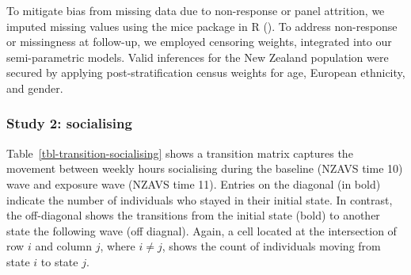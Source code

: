 \documentclass[
  singlecolumn]{article}
\begin{document}
To mitigate bias from missing data due to non-response or panel
attrition, we imputed missing values using the mice package in R
(). To address non-response
or missingness at follow-up, we employed censoring weights, integrated
into our semi-parametric models. Valid inferences for the New Zealand
population were secured by applying post-stratification census weights
for age, European ethnicity, and gender.

\subsubsection{Study 2: socialising}\label{study-2-socialising}

Table~\ref{tbl-transition-socialising} shows a transition matrix
captures the movement between weekly hours socialising during the
baseline (NZAVS time 10) wave and exposure wave (NZAVS time 11). Entries
on the diagonal (in bold) indicate the number of individuals who stayed
in their initial state. In contrast, the off-diagonal shows the
transitions from the initial state (bold) to another state the following
wave (off diagnal). Again, a cell located at the intersection of row
\(i\) and column \(j\), where \(i \neq j\), shows the count of
individuals moving from state \(i\) to state \(j\).
\end{document}

